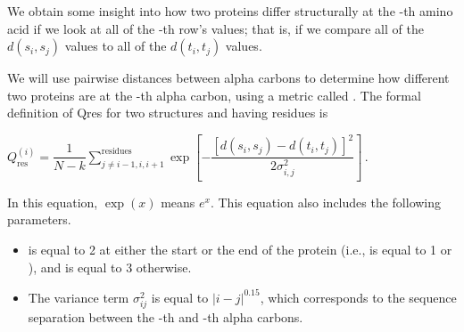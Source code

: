 \begin{note}\end{note}

\begin{qbox}\end{qbox}

We obtain some insight into how two proteins differ structurally at the -th amino acid if we look at all of the -th row's values; that is, if we compare all of the $d(s_{i}, s_{j})$ values to all of the $d(t_{i}, t_{j})$ values.

We will use pairwise distances between alpha carbons to determine how different two proteins are at the -th alpha carbon, using a metric called .  The formal definition of Qres for two structures  and  having  residues is

\begin{center}
$Q_{\text{res}}^{(i)} = \dfrac{1}{N-k} \displaystyle \sum^{\text{residues}}_{j\neq i-1,i,i+1} \exp\left[-\dfrac{[d(s_i,s_j)-d(t_i,t_j)]^2}{2\sigma^2_{i,j}}\right]$\,.
\end{center}

\noindent In this equation, $\exp(x)$ means $e^{x}$. This equation also includes the following parameters.

\begin{itemize}
	\item {} is equal to 2 at either the start or the end of the protein (i.e.,  is equal to 1 or ), and  is equal to 3 otherwise.
	\item The variance term $\sigma_{ij}^2$ is equal to $\left\lvert{i-j}\right\rvert ^{0.15}$, which corresponds to the sequence separation between the -th and -th alpha carbons.
\end{itemize}

\begin{note}\end{note}

